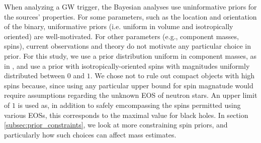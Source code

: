 When analyzing a GW trigger, the Bayesian analyses use uninformative priors for the sources' properties.  For some parameters, such as the location and orientation of the binary, uniformative priors (i.e. uniform in volume and isotropically oriented) are well-motivated.  For other parameters (e.g., component masses, spins), current observations and theory do not motivate any particular choice in prior.  For this study, we use a prior distribution uniform in component masses, as in \citet{2013arXiv1304.0670L}, and use a prior with isotropically-oriented spins with magnitudes uniformly distributed between $0$ and $1$.  We chose not to rule out compact objects with high spins because, since using any particular upper bound for spin magnatude would require assumptions regarding the unknown EOS of neutron stars. An upper limit of $1$ is used as, in addition to safely emcompassing the spins permitted using various EOSs, this corresponds to the maximal value for black holes.  In section \ref{subsec:prior_constraints}, we look at more constraining spin priors, and particularly how such choices can affect mass estimates.